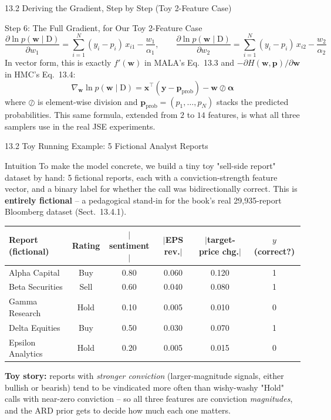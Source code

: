\documentclass[aspectratio=169,10pt]{beamer}
\newcommand{\w}{\mathbf{w}}
\newcommand{\x}{\mathbf{x}}
\newcommand{\y}{\mathbf{y}}
\newcommand{\p}{\mathbf{p}}
\newcommand{\Data}{\mathrm{D}}
\begin{document}
\begin{frame}[allowframebreaks]{13.2 \; Deriving the Gradient, Step by Step (Toy 2-Feature Case)}
\begin{block}{Step 6: The Full Gradient, for Our Toy 2-Feature Case}
\[
  \frac{\partial \ln p(\w\mid\Data)}{\partial w_1}
    = \sum_{i=1}^N (y_i-p_i)\,x_{i1} - \frac{w_1}{\alpha_1}, \qquad
  \frac{\partial \ln p(\w\mid\Data)}{\partial w_2}
    = \sum_{i=1}^N (y_i-p_i)\,x_{i2} - \frac{w_2}{\alpha_2}
\]
In vector form, this is exactly $f'(\w)$ in MALA's Eq.~13.3 and
$-\partial H(\w,\p)/\partial\w$ in HMC's Eq.~13.4:
\[
  \nabla_\w \ln p(\w\mid\Data) = \x^\top(\y-\p_{\text{prob}}) - \w\oslash\bm\alpha
\]
where $\oslash$ is element-wise division and $\p_{\text{prob}}=(p_1,\ldots,p_N)$
stacks the predicted probabilities. This same formula, extended from $2$ to
$14$ features, is what all three samplers use in the real JSE experiments.
\end{block}

\end{frame}

\begin{frame}{13.2 \; Toy Running Example: 5 Fictional Analyst Reports}
  \begin{block}{Intuition}
    To make the model concrete, we build a tiny toy "sell-side report"
    dataset by hand: 5 fictional reports, each with a conviction-strength
    feature vector, and a binary label for whether the call was
    bidirectionally correct. This is \textbf{entirely fictional} -- a
    pedagogical stand-in for the book's real 29{,}935-report Bloomberg
    dataset (Sect.~13.4.1).
  \end{block}
  \begin{center}
  \begin{tabular}{lccccc}
    \toprule
    Report (fictional) & Rating & $|$sentiment$|$ & $|$EPS rev.$|$ & $|$target-price chg.$|$ & $y$ (correct?)\\
    \midrule
    Alpha Capital     & Buy  & 0.80 & 0.060 & 0.120 & 1\\
    Beta Securities   & Sell & 0.60 & 0.040 & 0.080 & 1\\
    Gamma Research    & Hold & 0.10 & 0.005 & 0.010 & 0\\
    Delta Equities    & Buy  & 0.50 & 0.030 & 0.070 & 1\\
    Epsilon Analytics & Hold & 0.20 & 0.005 & 0.015 & 0\\
    \bottomrule
  \end{tabular}
  \end{center}
  \vspace{6pt}
  \textbf{Toy story:} reports with \emph{stronger conviction} (larger-magnitude
  signals, either bullish or bearish) tend to be vindicated more often than
  wishy-washy "Hold" calls with near-zero conviction -- so all three features
  are conviction \emph{magnitudes}, and the ARD prior gets to decide how much
  each one matters.
\end{frame}
\end{document}
